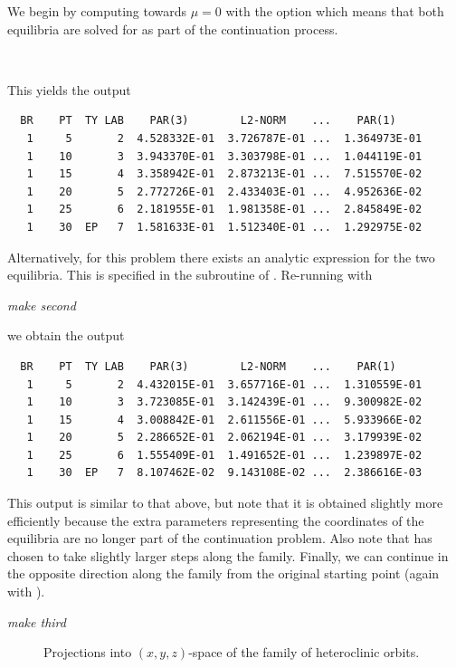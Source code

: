 \documentclass[12pt]{report}
\begin{document}
We begin by computing towards $\mu=0$ with the option 
which means that both equilibria are solved for as part of
the continuation process.
\begin{center}
 \\
\end{center} 
This yields the output
\begin{verbatim}
  BR    PT  TY LAB    PAR(3)        L2-NORM    ...    PAR(1)     
   1     5       2  4.528332E-01  3.726787E-01 ...  1.364973E-01
   1    10       3  3.943370E-01  3.303798E-01 ...  1.044119E-01
   1    15       4  3.358942E-01  2.873213E-01 ...  7.515570E-02
   1    20       5  2.772726E-01  2.433403E-01 ...  4.952636E-02
   1    25       6  2.181955E-01  1.981358E-01 ...  2.845849E-02
   1    30  EP   7  1.581633E-01  1.512340E-01 ...  1.292975E-02
\end{verbatim}
Alternatively, for this problem there exists an analytic expression for
the two equilibria. This is specified in the subroutine  of
. Re-running with 
\begin{center}
\it make second
\end{center} 
we obtain the output
\begin{verbatim}
  BR    PT  TY LAB    PAR(3)        L2-NORM    ...    PAR(1)     
   1     5       2  4.432015E-01  3.657716E-01 ...  1.310559E-01
   1    10       3  3.723085E-01  3.142439E-01 ...  9.300982E-02
   1    15       4  3.008842E-01  2.611556E-01 ...  5.933966E-02
   1    20       5  2.286652E-01  2.062194E-01 ...  3.179939E-02
   1    25       6  1.555409E-01  1.491652E-01 ...  1.239897E-02
   1    30  EP   7  8.107462E-02  9.143108E-02 ...  2.386616E-03
\end{verbatim}
This output is similar to that above, but note that it is obtained slightly
more efficiently because the extra parameters  representing the
coordinates of the equilibria are no longer
part of the continuation problem. Also note that \AUTO has chosen to take
slightly larger steps along the family. Finally, we can continue in the opposite
direction along the family from the original starting point (again with ).
\begin{center}
\it make third
\end{center}
%
\begin{figure}[b]
\epsfysize 9.0cm
\centerline{}
\caption{Projections into $(x,y,z)$-space of the family of heteroclinic
orbits.}
\label{Fshear}
\end{figure}
\end{document}
